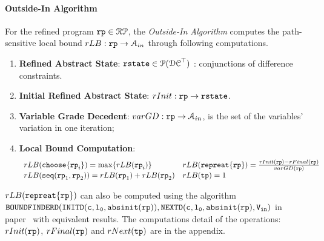 \paragraph*{Outside-In Algorithm}
For the refined program $\mathtt{rp} \in \mathcal{RP}$, the \emph{Outside-In Algorithm}
computes the path-sensitive local bound 
$rLB: \mathtt{rp} \to \mathcal{A}_{in}$ through following computations.
\begin{enumerate}
\item \textbf{{Refined Abstract State}}: 
$\mathtt{rstate} \in \mathcal{P}(\mathcal{DC}^{\top})$ : conjunctions of difference constraints.
\item \textbf{Initial Refined Abstract State}: $rInit : \mathtt{rp} \to \mathtt{rstate} $.
\item \textbf{Variable Grade Decedent}: $varGD : \mathtt{rp} \to \mathcal{A}_{in}$, is the set of the variables' variation in one iteration;
\item \textbf{Local Bound Computation}: 
\[
 \begin{array}{ll}
 rLB(\mathtt{choose}\{\mathtt{rp}_i\}) = \max\{rLB(\mathtt{rp}_i)\}
 &
 rLB(\mathtt{repreat}\{\mathtt{rp}\}) = \frac{rInit(\mathtt{rp}) - rFinal(\mathtt{rp})}{varGD(\mathtt{rp})}
 \\
 rLB(\mathtt{seq}(\mathtt{rp}_1, \mathtt{rp}_2)) = rLB(\mathtt{rp}_1)+ rLB( \mathtt{rp}_2)
 &
 rLB(\mathtt{tp}) = 1
 \end{array}
\]
\end{enumerate}
$rLB(\mathtt{repreat}\{\mathtt{rp}\})$ can also be computed using the algorithm 
$\mathtt{BOUNDFINDERD(INITD(c, l_0, \mathtt{abs}{\mathtt{init}}(\mathtt{rp})), NEXTD(c, l_0, \mathtt{abs}{\mathtt{init}}(\mathtt{rp}), V_{\mathtt{in}} )}$ 
in paper~\cite{GulwaniJK09} with equivalent results.
The computations detail of the operations: $rInit(\mathtt{rp})$,
$rFinal(\mathtt{rp})$ and $rNext(\mathtt{tp})$
are in the appendix.
